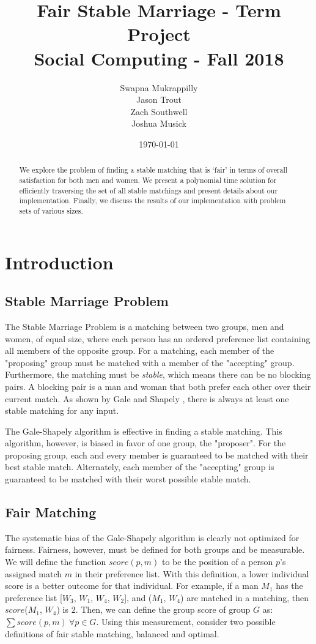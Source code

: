 \documentclass[a4paper]{article}
\title{Fair Stable Marriage - Term Project\\Social Computing - Fall 2018}
\author{Swapna Mukrappilly\\Jason Trout\\Zach Southwell\\Joshua Musick}
\date{\today}
\begin{document}
\maketitle

\begin{abstract}
We explore the problem of finding a stable matching that is `fair' in terms of overall satisfaction for both men and women. We present a polynomial time solution for efficiently traversing the set of all stable matchings and present details about our implementation. Finally, we discuss the results of our implementation with problem sets of various sizes.

\end{abstract}

\section{Introduction}
\label{sec:introduction}

\subsection{Stable Marriage Problem}
The Stable Marriage Problem is a matching between two groups, men and women, of equal size, where each person has an ordered preference list containing all members of the opposite group.
For a matching, each member of the "proposing" group must be matched with a member of the "accepting" group.
Furthermore, the matching must be \emph{stable}, which means there can be no blocking pairs.
A blocking pair is a man and woman that both prefer each other over their current match.
As shown by Gale and Shapely \cite{shapely}, there is always at least one stable matching for any input.

The Gale-Shapely algorithm is effective in finding a stable matching. 
This algorithm, however, is biased in favor of one group, the "proposer".
For the proposing group, each and every member is guaranteed to be matched with their best stable match. 
Alternately, each member of the "accepting" group is guaranteed to be matched with their worst possible stable match.

\subsection{Fair Matching}
The systematic bias of the Gale-Shapely algorithm is clearly not optimized for fairness.
Fairness, however, must be defined for both groups and be measurable.
We will define the function $score(p, m)$ to be the position of a person $p$'s assigned match $m$ in their preference list.
With this definition, a lower individual score is a better outcome for that individual.
For example, if a man $M_1$ has the preference list [$W_3$, $W_1$, $W_4$, $W_2$], and ($M_1$, $W_4$) are matched in a matching, then $score$($M_1$, $W_4$) is $2$.
Then, we can define the group score of group $G$ as: $\sum score(p,m)~ \forall p \in G$.
Using this measurement, consider two possible definitions of fair stable matching, balanced and optimal.
\end{document}
